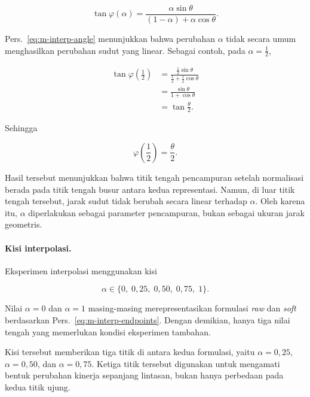 \begin{equation}
\boxed{
\tan\varphi(\alpha)
=
\frac{
\alpha\sin\theta
}{
(1-\alpha)+\alpha\cos\theta
}
}.
\label{eq:m-interp-angle}
\end{equation}

Pers.~\eqref{eq:m-interp-angle} menunjukkan bahwa perubahan $\alpha$ tidak
secara umum menghasilkan perubahan sudut yang linear. Sebagai contoh, pada
$\alpha=\frac12$,

\begin{align}
\tan\varphi\left(\frac12\right)
&=
\frac{\frac12\sin\theta}
{\frac12+\frac12\cos\theta}
\nonumber\\
&=
\frac{\sin\theta}{1+\cos\theta}
\nonumber\\
&=
\tan\frac{\theta}{2}.
\end{align}

Sehingga

\begin{equation}
\varphi\left(\frac12\right)
=
\frac{\theta}{2}.
\label{eq:m-interp-midpoint}
\end{equation}

Hasil tersebut menunjukkan bahwa titik tengah pencampuran setelah
normalisasi berada pada titik tengah busur antara kedua representasi.
Namun, di luar titik tengah tersebut, jarak sudut tidak berubah secara
linear terhadap $\alpha$. Oleh karena itu, $\alpha$ diperlakukan sebagai
parameter pencampuran, bukan sebagai ukuran jarak geometris.

\paragraph{Kisi interpolasi.}

Eksperimen interpolasi menggunakan kisi

\begin{equation}
\boxed{
\alpha
\in
\{0,\;0{,}25,\;0{,}50,\;0{,}75,\;1\}.
}
\label{eq:m-alpha-grid}
\end{equation}

Nilai $\alpha=0$ dan $\alpha=1$ masing-masing merepresentasikan formulasi
\textit{raw} dan \textit{soft} berdasarkan Pers.~\eqref{eq:m-interp-endpoints}.
Dengan demikian, hanya tiga nilai tengah yang memerlukan kondisi eksperimen
tambahan.

Kisi tersebut memberikan tiga titik di antara kedua formulasi, yaitu
$\alpha=0{,}25$, $\alpha=0{,}50$, dan $\alpha=0{,}75$. Ketiga titik tersebut
digunakan untuk mengamati bentuk perubahan kinerja sepanjang lintasan,
bukan hanya perbedaan pada kedua titik ujung.

